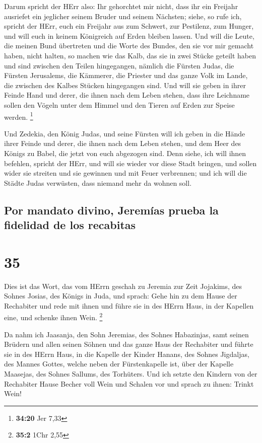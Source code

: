  Darum spricht der HErr also: Ihr gehorchtet mir nicht,
dass ihr ein Freijahr ausriefet ein jeglicher seinem Bruder und seinem
Nächsten; siehe, so rufe ich, spricht der HErr, euch ein Freijahr aus
zum Schwert, zur Pestilenz, zum Hunger, und will euch in keinem
Königreich auf Erden bleiben lassen.  Und will die Leute,
die meinen Bund übertreten und die Worte des Bundes, den sie vor mir
gemacht haben, nicht halten, so machen wie das Kalb, das sie in zwei
Stücke geteilt haben und sind zwischen den Teilen hingegangen,
 nämlich die Fürsten Judas, die Fürsten Jerusalems, die
Kämmerer, die Priester und das ganze Volk im Lande, die zwischen des
Kalbes Stücken hingegangen sind.  Und will sie geben in
ihrer Feinde Hand und derer, die ihnen nach dem Leben stehen, dass ihre
Leichname sollen den Vögeln unter dem Himmel und den Tieren auf Erden
zur Speise werden. \footnote{\textbf{34:20} Jer 7,33}

 Und Zedekia, den König Judas, und seine Fürsten will ich
geben in die Hände ihrer Feinde und derer, die ihnen nach dem Leben
stehen, und dem Heer des Königs zu Babel, die jetzt von euch abgezogen
sind.  Denn siehe, ich will ihnen befehlen, spricht der
HErr, und will sie wieder vor diese Stadt bringen, und sollen wider sie
streiten und sie gewinnen und mit Feuer verbrennen; und ich will die
Städte Judas verwüsten, dass niemand mehr da wohnen soll.

\hypertarget{por-mandato-divino-jeremuxedas-prueba-la-fidelidad-de-los-recabitas}{%
\subsection{Por mandato divino, Jeremías prueba la fidelidad de los
recabitas}\label{por-mandato-divino-jeremuxedas-prueba-la-fidelidad-de-los-recabitas}}

\hypertarget{section-34}{%
\section{35}\label{section-34}}

 Dies ist das Wort, das vom HErrn geschah zu Jeremia zur
Zeit Jojakims, des Sohnes Josias, des Königs in Juda, und sprach:
 Gehe hin zu dem Hause der Rechabiter und rede mit ihnen
und führe sie in des HErrn Haus, in der Kapellen eine, und schenke ihnen
Wein. \footnote{\textbf{35:2} 1Chr 2,55}

 Da nahm ich Jaasanja, den Sohn Jeremias, des Sohnes
Habazinjas, samt seinen Brüdern und allen seinen Söhnen und das ganze
Haus der Rechabiter  und führte sie in des HErrn Haus, in
die Kapelle der Kinder Hanans, des Sohnes Jigdaljas, des Mannes Gottes,
welche neben der Fürstenkapelle ist, über der Kapelle Maasejas, des
Sohnes Sallums, des Torhüters.  Und ich setzte den Kindern
von der Rechabiter Hause Becher voll Wein und Schalen vor und sprach zu
ihnen: Trinkt Wein!

